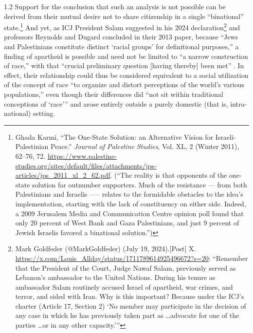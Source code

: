 \documentclass[../unravbook.tex]{subfiles}
\begin{document}
\begin{spacing}{1.2}
Support for the conclusion that such an analysis is not possible can be derived from their mutual desire not to share citizenship in a single \enquote{binational} state.\footnote{Ghada Karmi, ``The One-State Solution: an Alternative Vision for Israeli-Palestinian Peace.'' \textit{Journal of Palestine Studies}, Vol. XL, 2 (Winter 2011), 62--76, 72. \url{https://www.palestine-studies.org/sites/default/files/attachments/jps-articles/jps_2011_xl_2_62.pdf}. (``The reality is that opponents of the one-state solution far outnumber supporters. Much of the resistance --- from both Palestinians and Israelis --— relates to the formidable obstacles to the idea's implementation, starting with the lack of constituency on either side. Indeed, a 2009 Jerusalem Media and Communication Centre opinion poll found that only 20 percent of West Bank and Gaza Palestinians, and just 9 percent of Jewish Israelis favored a binational solution.'')} And yet, as ICJ President Salam suggested in his 2024 declaration\footnote{Mark Goldfeder (@MarkGoldfeder) (July 19, 2024).[Post] X. \url{https://x.com/Louis_Allday/status/1711789614925496672?s=20}: \enquote{Remember that the President of the Court, Judge Nawaf Salam, previously served as Lebanon's ambassador to the United Nations. During his tenure as ambassador Salam routinely accused Israel of apartheid, war crimes, and terror, and sided with Iran. Why is this important? Because under the ICJ's charter (Article 17, Section 2) \enquote{No member may participate in the decision of any case in which he has previously taken part as \ldots advocate for one of the parties \ldots or in any other capacity.}}} and professors Reynolds and Dugard concluded in their 2013 paper, because ``Jews and Palestinians constitute distinct `racial groups' for definitional purposes,'' a finding of apartheid is possible and need not be limited to ``a narrow construction of race,'' with that ``crucial preliminary question [having thereby] been met'' \parencite[885-889]{Dugard-2013}. In effect, their relationship could thus be considered equivalent to a social utilization of the concept of race \enquote{to organize and distort perceptions of the world's various populations,} even though their differences did \enquote{not sit within traditional conceptions of \enquote*{race}} \parencite[887]{Dugard-2013} and arose entirely outside a purely domestic (that is, intra-national) setting.


\end{spacing}
\end{document}

